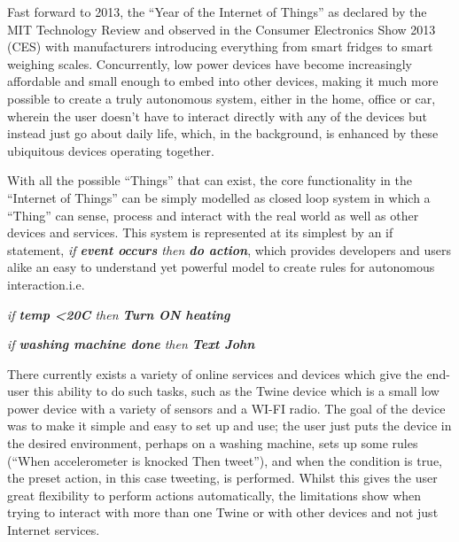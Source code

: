 Fast forward to 2013, the ``Year of the Internet of Things'' as declared by the MIT Technology Review\cite{2013IoT} and observed in the Consumer Electronics Show 2013 (CES) with manufacturers introducing everything from smart fridges to smart weighing scales. Concurrently, low power devices have become increasingly affordable and small enough to embed into other devices, making it much more possible to create a truly autonomous system, either in the home, office or car, wherein the user doesn't have to interact directly with any of the devices but instead just go about daily life, which, in the background, is enhanced by these ubiquitous devices operating together.

With all the possible ``Things'' that can exist, the core functionality in the ``Internet of Things'' can be simply modelled as closed loop system in which a ``Thing'' can sense, process and interact with the real world as well as other devices and services. This system is represented at its simplest by an if statement, \textit{if \textbf{event occurs} then \textbf{do action}}, which provides developers and users alike an easy to understand yet powerful model to create rules for autonomous interaction.i.e.
\begin{center}
	\textit{if \textbf{temp \textless  20C} then \textbf{Turn ON heating}}

	\textit{if \textbf{washing machine done} then \textbf{Text John}}
\end{center}

There currently exists a variety of online services and devices which give the end-user this ability to do such tasks, such as the Twine device \cite{Twine} which is a small low power device with a variety of sensors and a WI-FI radio. The goal of the device was to make it simple and easy to set up and use; the user just puts the device in the desired environment, perhaps on a washing machine, sets up some rules (``When accelerometer is knocked Then tweet''), and when the condition is true, the preset action, in this case tweeting, is performed. Whilst this gives the user great flexibility to perform actions automatically, the limitations show when trying to interact with more than one Twine or with other devices and not just Internet services. 

